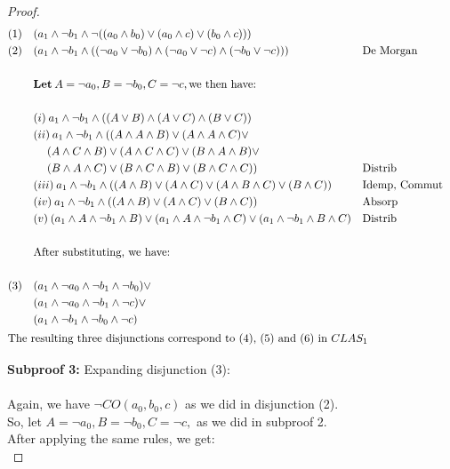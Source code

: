 \documentclass{article}
\begin{document}
\begin{proof}
\begin{align*}
	(1)  & \quad (a_1 \land \lnot b_1 \land \lnot((a_0 \land b_0) \lor (a_0 \land c) \lor (b_0 \land c)) ) \\
	(2)  & \quad (a_1 \land \lnot b_1 \land ((\lnot a_0 \lor \lnot b_0) \land (\lnot a_0 \lor \lnot c) \land (\lnot b_0 \lor \lnot c)))  && \text{De Morgan} \\ \\
	&	\quad \textbf{Let} \:  A = \lnot a_0, B = \lnot b_0, C = \lnot c, \text{we then have:} \\ \\
	& \quad (i)  \: a_1 \land \lnot b_1 \land ((A \lor B) \land (A \lor C) \land (B \lor C)) \\
	&	\quad (ii)  \: a_1 \land \lnot b_1 \land ((A \land A \land B) \lor 						(A \land A 	\land C) \lor \\
		& \qquad \: (A \land C \land B) \lor (A \land C \land C) \lor (B \land A \land B) \lor \\
		& \qquad \: (B \land A \land C) \lor (B \land C \land B) \lor
		(B \land C \land C)) && \text{Distrib} \\
	& \quad (iii)  \: a_1 \land \lnot b_1 \land ((A \land B) \lor(A \land C) \lor  (A \land B \land C) \lor (B \land C)) && \text{Idemp, Commut}  \\
	& \quad (iv)  \: a_1 \land \lnot b_1 \land ((A \land B) \lor(A \land C) \lor (B \land C)) && \text{Absorp}  \\
	& \quad (v)  \: (a_1 \land A  \land \lnot b_1 \land  B) \lor(a_1 \land A  \land \lnot b_1 \land  C) \lor (a_1  \land \lnot b_1 \land B \land C)  && \text{Distrib}  \\ \\ 
	&	\quad \text{After substituting, we have:} \\ \\
	(3)  & \quad (a_1 \land \lnot a_0  \land \lnot b_1 \land  \lnot b_0) \lor \\
		   & \quad (a_1 \land \lnot a_0  \land \lnot b_1 \land  \lnot c) \lor \\
		   & \quad (a_1  \land \lnot b_1 \land \lnot b_0 \land \lnot c)\\
	\intertext{The resulting three  disjunctions correspond to (4), (5) and (6) in $CLAS_1$}
\end{align*}
	
\textbf{Subproof 3:}  Expanding disjunction (3): \\ \\
\indent \indent	Again, we have $ \lnot CO(a_0, b_0, c) $ as we did in disjunction (2). \\ 
\indent \indent So, let $  A = \lnot a_0, B = \lnot b_0, C = \lnot c,$ as we did in subproof 2. \\
\indent \indent After applying the same rules, we get: \\


\end{proof}
\end{document}
